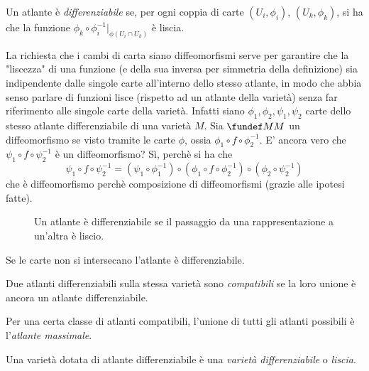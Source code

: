 \begin{defn}
	Un atlante è \emph{differenziabile} se,
	per ogni coppia di carte $(U_i,\phi_i)$, $(U_k,\phi_k)$, si ha che la funzione
	$\phi_k\circ\phi_i^{-1}|_{\phi(U_i\cap U_k)}$ è liscia.\footnotemark
\begin{oss}
	La richiesta che i cambi di carta siano diffeomorfismi serve per garantire che la "liscezza" di una funzione (e della sua inversa per simmetria della definizione) sia indipendente dalle singole carte all'interno dello stesso atlante, in modo che abbia senso parlare di funzioni lisce (rispetto ad un atlante della varietà) senza far riferimento alle singole carte della varietà.
	Infatti siano $\phi_1, \phi_2, \psi_1, \psi_2$ carte dello stesso atlante differenziabile di una varietà $M$. Sia $\fundef MM$ un diffeomorfismo se visto tramite le carte $\phi$, ossia $\phi_1\circ f\circ \phi_2^{-1}$. E' ancora vero che $\psi_1 \circ f \circ \psi_2^{-1}$ è un diffeomorfismo? Sì, perchè si ha che 
\begin{equation*}
	\psi_1 \circ f \circ \psi_2^{-1} = (\psi_1 \circ \phi_1^{-1})\circ (\phi_1\circ f\circ \phi_2^{-1})\circ (\phi_2 \circ \psi_2^{-1})
\end{equation*} 
	che è diffeomorfismo perchè composizione di diffeomorfismi (grazie alle ipotesi fatte).
\end{oss}
	\begin{figure}
    \centering
    
    \caption{Un atlante è differenziabile se il passaggio da una rappresentazione a un'altra è liscio.}
	\end{figure}
\end{defn}

\begin{oss}
	Se le carte non si intersecano l'atlante è differenziabile.
\end{oss}

\begin{defn}
	Due atlanti differenziabili sulla stessa varietà sono \emph{compatibili}
	se la loro unione è ancora un atlante differenziabile.
\end{defn}

\begin{defn}
	Per una certa classe di atlanti compatibili,
	l'unione di tutti gli atlanti possibili è l'\emph{atlante massimale}.
\end{defn}

\begin{defn}
	Una varietà dotata di atlante differenziabile è una \emph{varietà differenziabile} o \emph{liscia}.
\end{defn}

